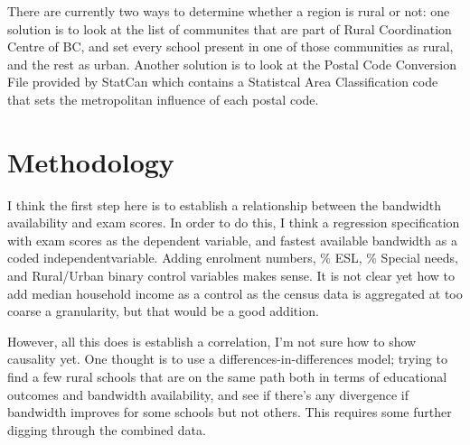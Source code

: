 \documentclass[12pt]{article}
\begin{document}
    There are currently two ways to determine whether a region is rural or not: one solution is to look at the list of communites that are part of Rural Coordination Centre of BC, and set every school present in one of those communities as rural, and the rest as urban. Another solution is to look at the Postal Code Conversion File provided by StatCan \cite{postalcode2021} which contains a Statistcal Area Classification code that sets the metropolitan influence of each postal code. 

    \section*{Methodology}
    I think the first step here is to establish a relationship between the bandwidth availability and exam scores. In order to do this, I think a regression specification with exam scores as the dependent variable, and fastest available bandwidth as a coded independentvariable. Adding enrolment numbers, \% ESL, \% Special needs, and Rural/Urban binary control variables makes sense. It is not clear yet how to add median household income as a control as the census data is aggregated at too coarse a granularity, but that would be a good addition. 
    
    However, all this does is establish a correlation, I'm not sure how to show causality yet. One thought is to use a differences-in-differences model; trying to find a few rural schools that are on the same path both in terms of educational outcomes and bandwidth availability, and see if there's any divergence if bandwidth improves for some schools but not others. This requires some further digging through the combined data.
    \newpage
    
\end{document}
